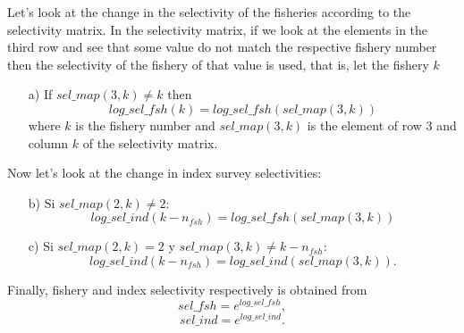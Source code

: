 \documentclass{article}
\begin{document}
Let's look at the change in the selectivity of the fisheries according to the selectivity matrix.
In the selectivity matrix, if we look at the elements in the third row and see that some value do not match the respective fishery number then the selectivity of the fishery of that value is used, that is, let the fishery $k$
\begin{itemize}
    \item[a)] If $sel\_map(3,k) \neq k$ then
    \begin{equation}
        log\_sel\_fsh(k)=log\_sel\_fsh(sel\_map(3,k))
    \end{equation}
    where $k$ is the fishery number and $sel\_map(3,k)$ 
    is the element of row 3 and column $k$ of the selectivity matrix.
\end{itemize}

Now let's look at the change in index survey selectivities:
\begin{itemize}
     \item[b)] Si $sel\_map(2,k) \neq 2$:
    \begin{equation}
        log\_sel\_ind(k-n_{fsh})=log\_sel\_fsh(sel\_map(3,k))
    \end{equation}
     \item[c)]Si $sel\_map(2,k) = 2$ y $sel\_map(3,k) \neq k-n_{fsh}$:
    \begin{equation}
        log\_sel\_ind(k-n_{fsh}) = log\_sel\_ind(sel\_map(3,k)).
    \end{equation}
\end{itemize}

   

Finally, fishery and index selectivity respectively is obtained from 
\begin{equation}
    sel\_fsh=e^{log\_sel\_fsh},
\end{equation}
\begin{equation}
    sel\_ind=e^{log\_sel\_ind}.
\end{equation}

\end{document}
